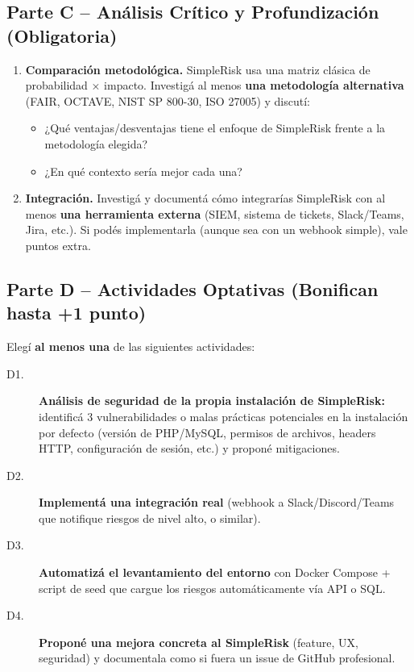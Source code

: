 \documentclass[11pt,a4paper]{article}
\begin{document}
\subsection{Parte C -- Análisis Crítico y Profundización (Obligatoria)}

\begin{enumerate}
    \item \textbf{Comparación metodológica.} SimpleRisk usa una matriz clásica de probabilidad × impacto. Investigá al menos \textbf{una metodología alternativa} (FAIR, OCTAVE, NIST SP 800-30, ISO 27005) y discutí:
    \begin{itemize}
        \item ¿Qué ventajas/desventajas tiene el enfoque de SimpleRisk frente a la metodología elegida?
        \item ¿En qué contexto sería mejor cada una?
    \end{itemize}
    
    \item \textbf{Integración.} Investigá y documentá cómo integrarías SimpleRisk con al menos \textbf{una herramienta externa} (SIEM, sistema de tickets, Slack/Teams, Jira, etc.). Si podés implementarla (aunque sea con un webhook simple), vale puntos extra.
\end{enumerate}

\subsection{Parte D -- Actividades Optativas (Bonifican hasta +1 punto)}

Elegí \textbf{al menos una} de las siguientes actividades:

\begin{description}
    \item[D1.] \textbf{Análisis de seguridad de la propia instalación de SimpleRisk:} identificá 3 vulnerabilidades o malas prácticas potenciales en la instalación por defecto (versión de PHP/MySQL, permisos de archivos, headers HTTP, configuración de sesión, etc.) y proponé mitigaciones.
    
    \item[D2.] \textbf{Implementá una integración real} (webhook a Slack/Discord/Teams que notifique riesgos de nivel alto, o similar).
    
    \item[D3.] \textbf{Automatizá el levantamiento del entorno} con Docker Compose + script de seed que cargue los riesgos automáticamente vía API o SQL.
    
    \item[D4.] \textbf{Proponé una mejora concreta al SimpleRisk} (feature, UX, seguridad) y documentala como si fuera un issue de GitHub profesional.
\end{description}
\end{document}
